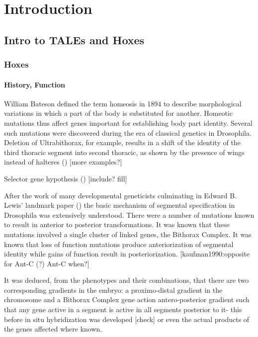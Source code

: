 \chapter{Introduction}


\label{chp:intro}

\section{Intro to TALEs and Hoxes}

\subsection{Hoxes}

\subsubsection{History, Function}

William Bateson defined the term homeosis in 1894 to describe morphological variations in which a part of the body is substituted for another. Homeotic mutations thus affect genes important for establishing body part identity. Several such mutations were discovered during the era of classical genetics in Drosophila. Deletion of Ultrabithorax, for example, results in a shift of the identity of the third thoracic segment into second thoracic, as shown by the presence of wings instead of halteres (\cite{ref}) [more examples?]

Selector gene hypothesis (\cite{Garcia-Bellido1975,Garcia-Bellido1977}) [include? fill]

After the work of many developmental geneticists culminating in Edward B. Lewis' landmark paper (\cite{Lewis1978}) the basic mechanism of segmental specification in Drosophila was extensively understood. There were a number of mutations known to result in anterior to posterior transformations. It was known that these mutations involved a single cluster of linked genes, the Bithorax Complex. It was known that loss of function mutations produce anteriorization of segmental identity while gains of function result in posteriorization. [kaufman1990:opposite for Ant-C (?) Ant-C when?]

It was deduced, from the phenotypes and their combinations, that there are two corresponding gradients in the embryo: a proximo-distal gradient in the chromosome and a Bithorax Complex gene action antero-posterior gradient such that any gene active in a segment is active in all segments posterior to it- this before in situ hybridization was developed [check] or even the actual products of the genes affected where known.

